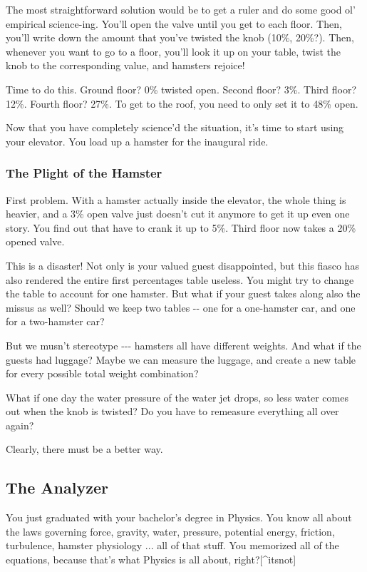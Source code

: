 \documentclass[]{article}
\begin{document}
The most straightforward solution would be to get a ruler and do some good ol'
empirical science-ing. You'll open the valve until you get to each floor. Then,
you'll write down the amount that you've twisted the knob (10\%, 20\%?). Then,
whenever you want to go to a floor, you'll look it up on your table, twist the
knob to the corresponding value, and hamsters rejoice!

Time to do this. Ground floor? 0\% twisted open. Second floor? 3\%. Third floor?
12\%. Fourth floor? 27\%. To get to the roof, you need to only set it to 48\%
open.

Now that you have completely science'd the situation, it's time to start using
your elevator. You load up a hamster for the inaugural ride.

\subsubsection{The Plight of the Hamster}

First problem. With a hamster actually inside the elevator, the whole thing is
heavier, and a 3\% open valve just doesn't cut it anymore to get it up even one
story. You find out that have to crank it up to 5\%. Third floor now takes a
20\% opened valve.

This is a disaster! Not only is your valued guest disappointed, but this fiasco
has also rendered the entire first percentages table useless. You might try to
change the table to account for one hamster. But what if your guest takes along
also the missus as well? Should we keep two tables -\/- one for a one-hamster
car, and one for a two-hamster car?

But we musn't stereotype -\/-\/- hamsters all have different weights. And what
if the guests had luggage? Maybe we can measure the luggage, and create a new
table for every possible total weight combination?

What if one day the water pressure of the water jet drops, so less water comes
out when the knob is twisted? Do you have to remeasure everything all over
again?

Clearly, there must be a better way.

\subsection{The Analyzer}

You just graduated with your bachelor's degree in Physics. You know all about
the laws governing force, gravity, water, pressure, potential energy, friction,
turbulence, hamster physiology ... all of that stuff. You memorized all of the
equations, because that's what Physics is all about, right?{[}\^{}itsnot{]}
\end{document}
